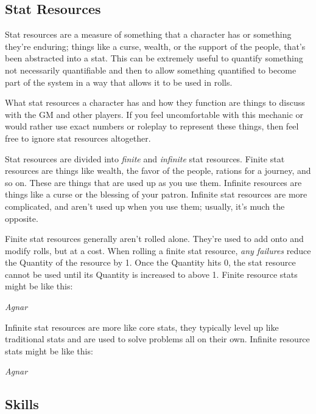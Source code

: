 \documentclass[../main.tex]{subfiles}
\begin{document}
    \subsection{Stat Resources}

        Stat resources are a measure of something that a character has or something they're enduring; things like a curse, wealth, or the support of the people, that's been abstracted into a stat. This can be extremely useful to quantify something not necessarily quantifiable and then to allow something quantified to become part of the system in a way that allows it to be used in rolls.
        
        What stat resources a character has and how they function are things to discuss with the GM and other players. If you feel uncomfortable with this mechanic or would rather use exact numbers or roleplay to represent these things, then feel free to ignore stat resources altogether.

        Stat resources are divided into \emph{finite} and \emph{infinite} stat resources. Finite stat resources are things like wealth, the favor of the people, rations for a journey, and so on. These are things that are used up as you use them. Infinite resources are things like a curse or the blessing of your patron. Infinite stat resources are more complicated, and aren't used up when you use them; usually, it's much the opposite.

        Finite stat resources generally aren't rolled alone. They're used to add onto and modify rolls, but at a cost. When rolling a finite stat resource, \emph{any failures} reduce the Quantity of the resource by 1. Once the Quantity hits 0, the stat resource cannot be used until its Quantity is increased to above 1. Finite resource stats might be like this:

            \begin{displayquote}
                \emph{Agnar }
            \end{displayquote}

        Infinite stat resources are more like core stats, they typically level up like traditional stats and are used to solve problems all on their own. Infinite resource stats might be like this: 

            \begin{displayquote}
                \emph{Agnar }
            \end{displayquote}

    \subsection{Skills}
\end{document}
